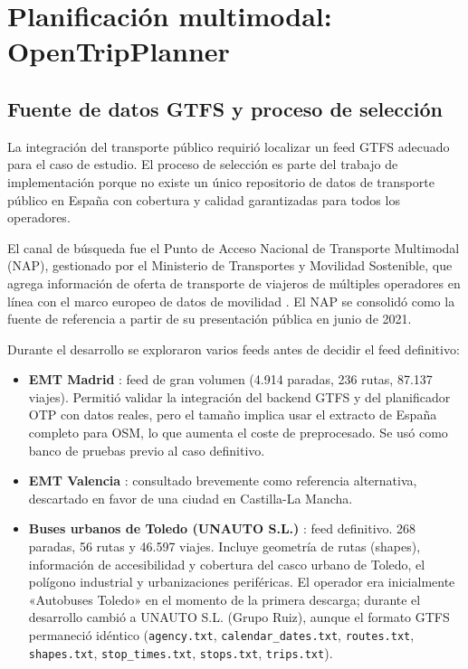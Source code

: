 \section{Planificación multimodal: OpenTripPlanner}
\label{sec:impl_otp}

\subsection{Fuente de datos GTFS y proceso de selección}

La integración del transporte público requirió localizar un feed GTFS adecuado para el caso de estudio. El proceso de selección es parte del trabajo de implementación porque no existe un único repositorio de datos de transporte público en España con cobertura y calidad garantizadas para todos los operadores.

El canal de búsqueda fue el Punto de Acceso Nacional de Transporte Multimodal (NAP), gestionado por el Ministerio de Transportes y Movilidad Sostenible, que agrega información de oferta de transporte de viajeros de múltiples operadores en línea con el marco europeo de datos de movilidad \cite{NAPHome}. El NAP se consolidó como la fuente de referencia a partir de su presentación pública en junio de 2021.

Durante el desarrollo se exploraron varios feeds antes de decidir el feed definitivo:

\begin{itemize}
  \item \textbf{EMT Madrid} \cite{NAPEMTMadrid}: feed de gran volumen (4.914 paradas, 236 rutas, 87.137 viajes). Permitió validar la integración del backend GTFS y del planificador OTP con datos reales, pero el tamaño implica usar el extracto de España completo para OSM, lo que aumenta el coste de preprocesado. Se usó como banco de pruebas previo al caso definitivo.
  \item \textbf{EMT Valencia} \cite{NAPEMTValencia}: consultado brevemente como referencia alternativa, descartado en favor de una ciudad en Castilla-La Mancha.
  \item \textbf{Buses urbanos de Toledo (UNAUTO S.L.)} \cite{NAPToledoUrbano}: feed definitivo. 268 paradas, 56 rutas y 46.597 viajes. Incluye geometría de rutas (shapes), información de accesibilidad y cobertura del casco urbano de Toledo, el polígono industrial y urbanizaciones periféricas. El operador era inicialmente «Autobuses Toledo» en el momento de la primera descarga; durante el desarrollo cambió a UNAUTO S.L. (Grupo Ruiz), aunque el formato GTFS permaneció idéntico (\texttt{agency.txt}, \texttt{calendar\_dates.txt}, \texttt{routes.txt}, \texttt{shapes.txt}, \texttt{stop\_times.txt}, \texttt{stops.txt}, \texttt{trips.txt}).
\end{itemize}

